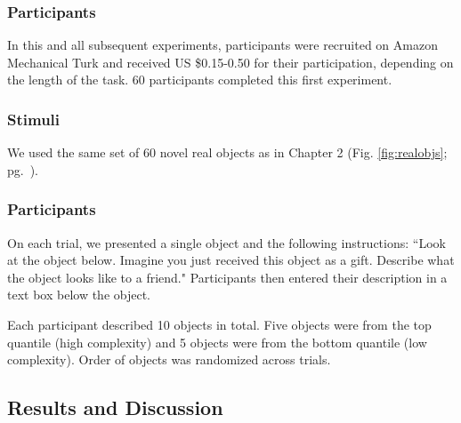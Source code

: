 \subsubsection{Participants} 
In this and all subsequent experiments, participants were recruited on Amazon Mechanical Turk and received US \$0.15-0.50 for their participation, depending on the length of the task. 60 participants completed this first experiment.
\subsubsection{Stimuli}  
We used the same set of 60 novel real objects as in Chapter 2 (Fig. \ref{fig:realobjs}; pg.\ \pageref{fig:realobjs}).
\subsubsection{Participants} 
On each trial, we presented a single object and the following instructions:  ``Look at the object below. Imagine you just received this object as a gift. Describe what the object looks like to a friend." Participants then entered their description in a text box below the object.

Each participant described 10 objects in total. Five objects were from the top quantile (high complexity) and 5 objects were from the bottom quantile (low complexity). Order of objects was randomized across trials.

\subsection{Results and Discussion}


